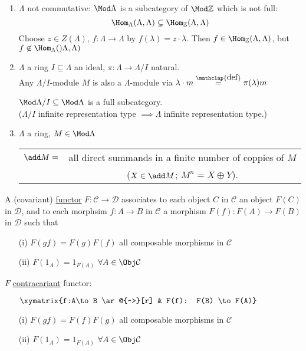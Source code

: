 \begin{exam}
\begin{enumerate}
\item $\Lambda$ not commutative: $\Mod \Lambda$ is a subcategory of $\Mod\mathbb{Z}$ which is not full: \[\Hom_\Lambda(\Lambda, \Lambda) \subsetneq \Hom_\mathbb{Z}(\Lambda, \Lambda)\]
Choose $z \in Z(\Lambda)$, $f: \Lambda \to \Lambda$ by $f(\lambda) = z\cdot \lambda$. Then $f \in \Hom_\mathbb{Z}(\Lambda, \Lambda)$, but $f \not\in \Hom_\Lambda()\Lambda,\Lambda)$ 

\item $\Lambda$ a ring $I \subseteq \Lambda$ an ideal, $\pi : \Lambda \to \Lambda/I$ natural.\\
Any $\Lambda/I$-module $M$ is also a $\Lambda$-module via $\lambda \cdot m \stackrel{\mathclap{\normalfont\mbox{def}}}{=} \pi(\lambda)m$
\begin{exer}
$\Mod \Lambda/I \subseteq \Mod \Lambda$ is a full subcategory.\\ ($\Lambda/I$ infinite representation type $\implies \Lambda$ infinite representation type.)
\end{exer}

\item $\Lambda$ a ring, $M \in \Mod\Lambda$\\
\begin{tabular}{cc}
$\add M = $ &all direct summands in a finite number of coppies of $M$\\&($X \in \add M$; $M^n = X \oplus Y$).
\end{tabular}
\end{enumerate}
\end{exam}

\begin{defin}
A (covariant) \underline{functor} $F: \mathcal{C} \to \mathcal{D}$ associates to each object $C$ in $\mathcal{C}$ an object $F(C)$ in $\mathcal{D}$, and to each morphsim $f:A\to B$ in $\mathcal{C}$ a morphism $F(f):F(A)\to F(B)$ in $\mathcal{D}$ such that
\begin{enumerate}
\item[(i)] $F(gf) = F(g)F(f)$ all composable morphisms in $\mathcal{C}$
\item[(ii)] $F(1_A) = 1_{F(A)}$ $\forall A \in \Obj \mathcal{C}$
\end{enumerate}
$F$ \underline{contracariant} functor:
\begin{enumerate}
\item[] $\xymatrix{f:A\to B \ar@{~>}[r] & F(f): F(B) \to F(A)}$
\item[(i)] $F(gf) = F(f)F(g)$ all composable morphisms in $\mathcal{C}$
\item[(ii)] $F(1_A) = 1_{F(A)}$ $\forall A \in \Obj \mathcal{C}$
\end{enumerate}
\end{defin}


